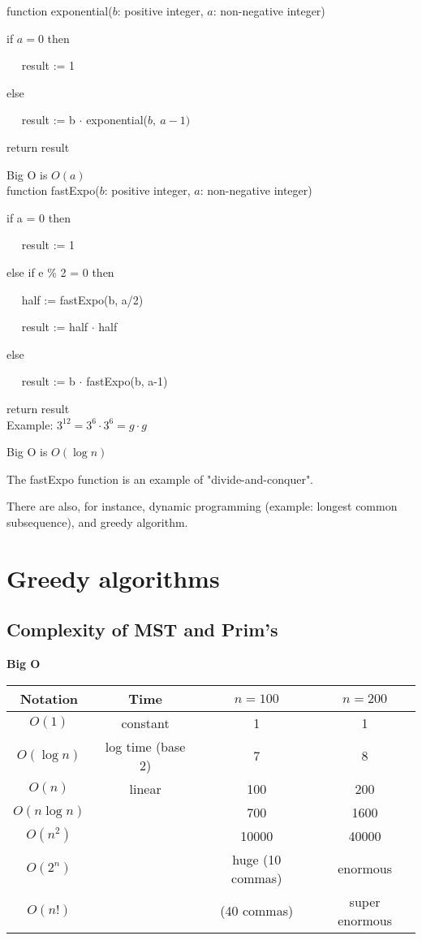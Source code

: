 \documentclass[english,openany]{book}
\begin{document}
    \noindent
    function exponential($b$: positive integer, $a$: non-negative integer)

    if $a = 0$ then

    $\quad$ result := 1

    else

    $\quad$ result := b $\cdot$ exponential($b,\ a-1)$

    return result

    Big O is $O(a)$\\

    \noindent
    function fastExpo($b$: positive integer, $a$: non-negative integer)

    if a = 0 then

    $\quad$ result := 1

    else if e \% 2 = 0 then

    $\quad$ half := fastExpo(b, a/2)

    $\quad$ result := half $\cdot$ half

    else

    $\quad$ result := b $\cdot$ fastExpo(b, a-1)

    return result\\

    Example: $3^{12} = 3^6 \cdot 3^6 = g \cdot g$

    Big O is $O(\log n)$

    The fastExpo function is an example of "divide-and-conquer".

    There are also, for instance, dynamic programming (example: longest common subsequence), and greedy algorithm.

    \section{Greedy algorithms}

    \subsection{Complexity of MST and Prim's}

    \textbf{Big O}

    \begin{tabular}{c|c|cc}
        Notation&Time&$n=100$&$n=200$\\
        \hline
        $O(1)$&constant&1&1\\
        $O(\log n)$&log time (base 2)&7&8\\
        $O(n)$&linear&100&200\\
        $O(n \log n)$&&700&1600\\
        $O(n^2)$&&10000&40000\\
        $O(2^n)$&&huge (10 commas)&enormous\\
        $O(n!)$&&(40 commas)&super enormous\\
    \end{tabular}\\
\end{document}
